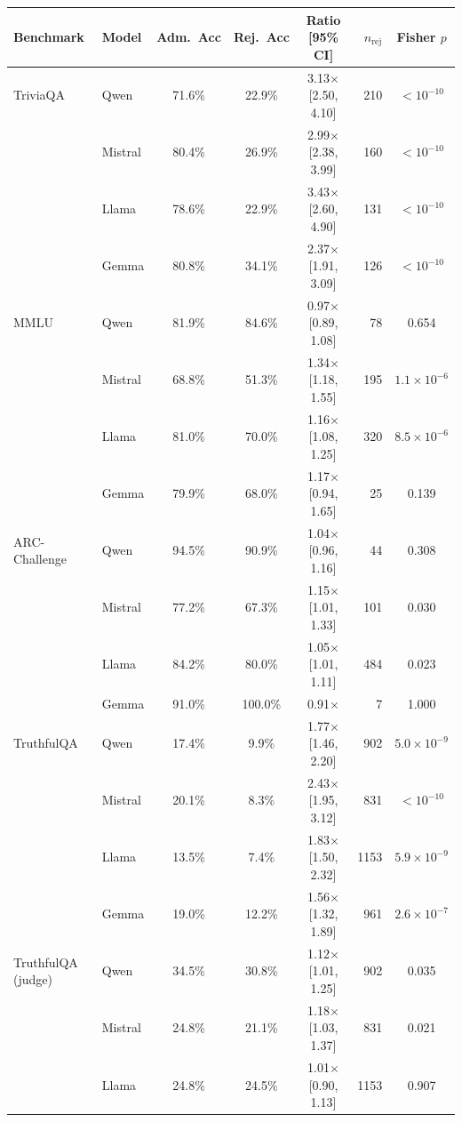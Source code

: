 \begin{table}[h]
\centering
\footnotesize
\begin{tabular}{llcccrc}
\toprule
Benchmark & Model & Adm.\ Acc & Rej.\ Acc & Ratio [95\% CI] & $n_{\text{rej}}$ & Fisher $p$ \\
\midrule
TriviaQA & Qwen & 71.6\% & 22.9\% & 3.13$\times$ [2.50, 4.10] & 210 & $<10^{-10}$ \\
 & Mistral & 80.4\% & 26.9\% & 2.99$\times$ [2.38, 3.99] & 160 & $<10^{-10}$ \\
 & Llama & 78.6\% & 22.9\% & 3.43$\times$ [2.60, 4.90] & 131 & $<10^{-10}$ \\
 & Gemma & 80.8\% & 34.1\% & 2.37$\times$ [1.91, 3.09] & 126 & $<10^{-10}$ \\
\midrule
MMLU & Qwen & 81.9\% & 84.6\% & 0.97$\times$ [0.89, 1.08] & 78 & 0.654 \\
 & Mistral & 68.8\% & 51.3\% & 1.34$\times$ [1.18, 1.55] & 195 & $1.1\times 10^{-6}$ \\
 & Llama & 81.0\% & 70.0\% & 1.16$\times$ [1.08, 1.25] & 320 & $8.5\times 10^{-6}$ \\
 & Gemma & 79.9\% & 68.0\% & 1.17$\times$ [0.94, 1.65] & 25 & 0.139 \\
\midrule
ARC-Challenge & Qwen & 94.5\% & 90.9\% & 1.04$\times$ [0.96, 1.16] & 44 & 0.308 \\
 & Mistral & 77.2\% & 67.3\% & 1.15$\times$ [1.01, 1.33] & 101 & 0.030 \\
 & Llama & 84.2\% & 80.0\% & 1.05$\times$ [1.01, 1.11] & 484 & 0.023 \\
 & Gemma & 91.0\% & 100.0\% & 0.91$\times$ & 7 & 1.000 \\
\midrule
TruthfulQA & Qwen & 17.4\% & 9.9\% & 1.77$\times$ [1.46, 2.20] & 902 & $5.0\times 10^{-9}$ \\
 & Mistral & 20.1\% & 8.3\% & 2.43$\times$ [1.95, 3.12] & 831 & $<10^{-10}$ \\
 & Llama & 13.5\% & 7.4\% & 1.83$\times$ [1.50, 2.32] & 1153 & $5.9\times 10^{-9}$ \\
 & Gemma & 19.0\% & 12.2\% & 1.56$\times$ [1.32, 1.89] & 961 & $2.6\times 10^{-7}$ \\
\midrule
TruthfulQA (judge) & Qwen & 34.5\% & 30.8\% & 1.12$\times$ [1.01, 1.25] & 902 & 0.035 \\
 & Mistral & 24.8\% & 21.1\% & 1.18$\times$ [1.03, 1.37] & 831 & 0.021 \\
 & Llama & 24.8\% & 24.5\% & 1.01$\times$ [0.90, 1.13] & 1153 & 0.907 \\

\end{tabular}
\end{table}
